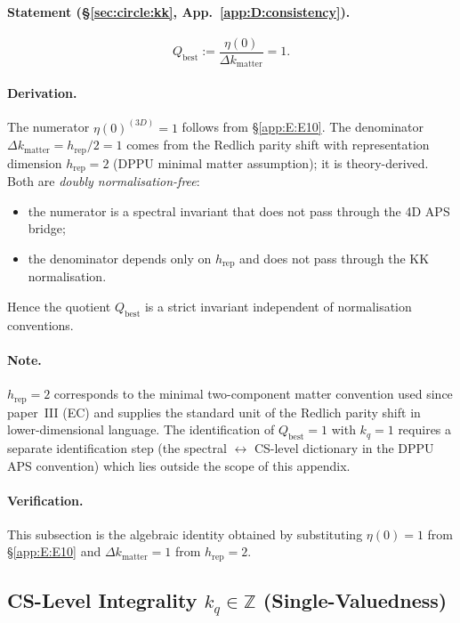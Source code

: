 \paragraph{Statement (\S\ref{sec:circle:kk}, App.~\ref{app:D:consistency}).}
\begin{equation}
  Q_{\mathrm{best}} := \frac{\eta(0)}{\Delta k_{\mathrm{matter}}} = 1.
\end{equation}

\paragraph{Derivation.}
The numerator $\eta(0)^{(3D)} = 1$ follows from \S\ref{app:E:E10}.  The
denominator $\Delta k_{\mathrm{matter}} = h_{\mathrm{rep}}/2 = 1$ comes from
the Redlich parity shift \cite{Redlich1984} with representation dimension
$h_{\mathrm{rep}} = 2$ (DPPU minimal matter assumption); it is
theory-derived.  Both are \emph{doubly normalisation-free}:
\begin{itemize}
  \item the numerator is a spectral invariant that does not pass through
        the 4D APS bridge;
  \item the denominator depends only on $h_{\mathrm{rep}}$ and does not pass
        through the KK normalisation.
\end{itemize}
Hence the quotient $Q_{\mathrm{best}}$ is a strict invariant independent of
normalisation conventions.

\paragraph{Note.}
$h_{\mathrm{rep}} = 2$ corresponds to the minimal two-component matter
convention used since paper~III (EC) and supplies the
standard unit of the Redlich parity shift in lower-dimensional language.
The identification of $Q_{\mathrm{best}} = 1$ with $k_q = 1$ requires a
separate identification step (the spectral $\leftrightarrow$ CS-level
dictionary in the DPPU APS convention) which lies outside the scope
of this appendix.

\paragraph{Verification.}
This subsection is the algebraic identity obtained by substituting
$\eta(0) = 1$ from \S\ref{app:E:E10} and $\Delta k_{\mathrm{matter}} = 1$
from $h_{\mathrm{rep}} = 2$.

\subsection{CS-Level Integrality $k_q\in\mathbb{Z}$ (Single-Valuedness)}
\label{app:E:E13}

